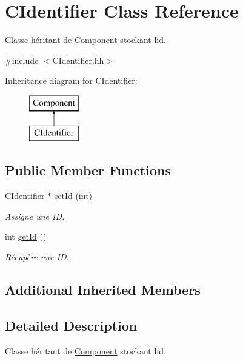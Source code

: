 \hypertarget{class_c_identifier}{}\section{C\+Identifier Class Reference}
\label{class_c_identifier}


Classe héritant de \hyperlink{class_component}{Component} stockant l\textquotesingle{}id.  




{\ttfamily \#include $<$C\+Identifier.\+hh$>$}

Inheritance diagram for C\+Identifier\+:\begin{figure}[H]
\begin{center}
\leavevmode
\includegraphics[height=2.000000cm]{class_c_identifier}
\end{center}
\end{figure}
\subsection*{Public Member Functions}
\begin{DoxyCompactItemize}
\item 
\hyperlink{class_c_identifier}{C\+Identifier} $\ast$ \hyperlink{class_c_identifier_a0b0e4bef79c2ae06659166b8acf3fc4c}{set\+Id} (int)
\begin{DoxyCompactList}\small\item\em Assigne une I\+D. \end{DoxyCompactList}\item 
int \hyperlink{class_c_identifier_aa7ca7f565792853d3e41c3b9c04aa193}{get\+Id} ()
\begin{DoxyCompactList}\small\item\em Récupère une I\+D. \end{DoxyCompactList}\end{DoxyCompactItemize}
\subsection*{Additional Inherited Members}


\subsection{Detailed Description}
Classe héritant de \hyperlink{class_component}{Component} stockant l\textquotesingle{}id. 

